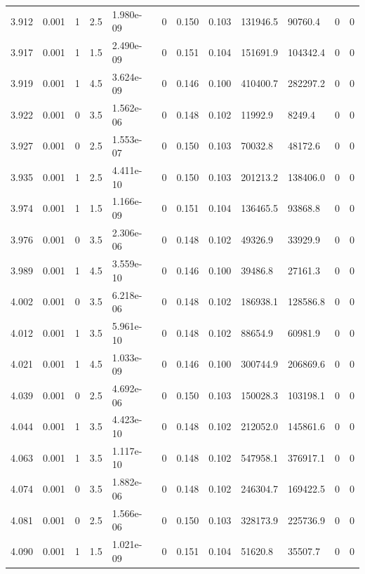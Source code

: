 \documentclass[preview]{standalone}
\begin{document}
{{{{{{{{{\begin{tabular}{L{1.2cm}C{1.2cm} C{0.3cm}C{0.5cm} C{1.4cm}C{1.4cm} C{1.4cm}C{1.4cm} C{1.6cm}C{1.6cm} C{1.6cm}C{1.6cm}}
  3.912  &  0.001  & 1     & 2.5 &  1.980e-09  & 0  &  0.150&   0.103& 131946.5 & 90760.4   &  0 & 0  \\ 
  3.917  &  0.001  & 1     & 1.5 &  2.490e-09  & 0  &  0.151&   0.104& 151691.9 & 104342.4   &  0 & 0  \\ 
  3.919  &  0.001  & 1     & 4.5 &  3.624e-09  & 0  &  0.146&   0.100& 410400.7 & 282297.2   &  0 & 0  \\ 
  3.922  &  0.001  & 0     & 3.5 &  1.562e-06  & 0  &  0.148&   0.102& 11992.9 & 8249.4   &  0 & 0  \\ 
  3.927  &  0.001  & 0     & 2.5 &  1.553e-07  & 0  &  0.150&   0.103& 70032.8 & 48172.6   &  0 & 0  \\ 
  3.935  &  0.001  & 1     & 2.5 &  4.411e-10  & 0  &  0.150&   0.103& 201213.2 & 138406.0   &  0 & 0  \\ 
  3.974  &  0.001  & 1     & 1.5 &  1.166e-09  & 0  &  0.151&   0.104& 136465.5 & 93868.8   &  0 & 0  \\ 
  3.976  &  0.001  & 0     & 3.5 &  2.306e-06  & 0  &  0.148&   0.102& 49326.9 & 33929.9   &  0 & 0  \\ 
  3.989  &  0.001  & 1     & 4.5 &  3.559e-10  & 0  &  0.146&   0.100& 39486.8 & 27161.3   &  0 & 0  \\ 
  4.002  &  0.001  & 0     & 3.5 &  6.218e-06  & 0  &  0.148&   0.102& 186938.1 & 128586.8   &  0 & 0  \\ 
  4.012  &  0.001  & 1     & 3.5 &  5.961e-10  & 0  &  0.148&   0.102& 88654.9 & 60981.9   &  0 & 0  \\ 
  4.021  &  0.001  & 1     & 4.5 &  1.033e-09  & 0  &  0.146&   0.100& 300744.9 & 206869.6   &  0 & 0  \\ 
  4.039  &  0.001  & 0     & 2.5 &  4.692e-06  & 0  &  0.150&   0.103& 150028.3 & 103198.1   &  0 & 0  \\ 
  4.044  &  0.001  & 1     & 3.5 &  4.423e-10  & 0  &  0.148&   0.102& 212052.0 & 145861.6   &  0 & 0  \\ 
  4.063  &  0.001  & 1     & 3.5 &  1.117e-10  & 0  &  0.148&   0.102& 547958.1 & 376917.1   &  0 & 0  \\ 
  4.074  &  0.001  & 0     & 3.5 &  1.882e-06  & 0  &  0.148&   0.102& 246304.7 & 169422.5   &  0 & 0  \\ 
  4.081  &  0.001  & 0     & 2.5 &  1.566e-06  & 0  &  0.150&   0.103& 328173.9 & 225736.9   &  0 & 0  \\ 
  4.090  &  0.001  & 1     & 1.5 &  1.021e-09  & 0  &  0.151&   0.104& 51620.8 & 35507.7   &  0 & 0  \\ 

\end{tabular}}}}}}}}}}
\end{document}
